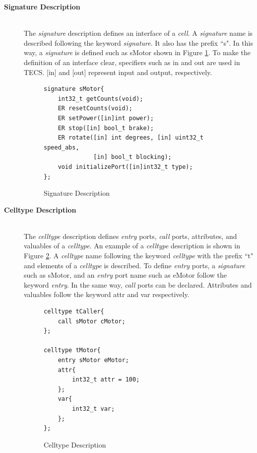 \documentclass[conference,compsoc]{IEEEtran}
\begin{document}
\begin{description}
    \item[{\bf Signature Description}]\mbox{}\\
        The {\it signature} description defines an interface of a {\it cell}.
        A {\it signature} name is described following the keyword {\it signature}.
        It also has the prefix ``s".
        In this way, a {\it signature} is defined such as sMotor shown in Figure \ref{signature}.
        To make the definition of an interface clear, specifiers such as in and out are used in TECS.
        [in] and [out] represent input and output, respectively.\\
\begin{figure}[t]
\centering
\begin{lstlisting}
signature sMotor{
    int32_t getCounts(void);
    ER resetCounts(void);
    ER setPower([in]int power);
    ER stop([in] bool_t brake);
    ER rotate([in] int degrees, [in] uint32_t speed_abs,
              [in] bool_t blocking);
    void initializePort([in]int32_t type);
};
\end{lstlisting}
\caption{Signature Description}
\label{signature}
\end{figure}

    \item[{\bf Celltype Description}]\mbox{}\\
        The {\it celltype} description defines {\it entry} ports, {\it call} ports, attributes, and valuables of a {\it celltype}.
        An example of a {\it celltype} description is shown in Figure \ref{celltype}.
        A {\it celltype} name following the keyword {\it celltype} with the prefix ``t" and elements of a {\it celltype} is described.
        To define {\it entry} ports, a {\it signature} such as sMotor, and an {\it entry} port name such as eMotor follow the keyword {\it entry}.
        In the same way, {\it call} ports can be declared.
        Attributes and valuables follow the keyword attr and var respectively.\\
\begin{figure}[t]
\centering
\begin{lstlisting}
celltype tCaller{
    call sMotor cMotor;
};

celltype tMotor{
    entry sMotor eMotor;
    attr{
        int32_t attr = 100;
    };
    var{
        int32_t var;
    };
};
\end{lstlisting}
\caption{Celltype Description}
\label{celltype}
\end{figure}


\end{description}
\end{document}

